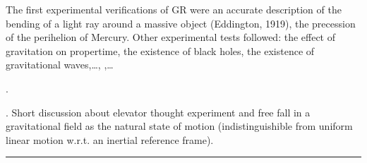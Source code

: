 \documentclass[letterpaper,10pt,english]{jupyterBook}
\begin{document}
\sphinxAtStartPar
{} The first experimental verifications of GR were an accurate description of the bending of a light ray around a massive object (Eddington, 1919), the precession of the perihelion of Mercury. Other experimental tests followed: the effect of gravitation on proper\sphinxhyphen{}time, the existence of black holes, the existence of gravitational waves,…, ,…

\sphinxAtStartPar
{}%
\begin{footnote}[2]\sphinxAtStartFootnote
{}.
%
\end{footnote}%
\begin{footnote}[3]\sphinxAtStartFootnote
{}. Short discussion about elevator thought experiment and free fall in a gravitational field as the natural state of motion (indistinguishible from uniform linear motion w.r.t. an inertial reference frame).
%
\end{footnote}


\bigskip\hrule\bigskip


\sphinxstepscope
\end{document}
